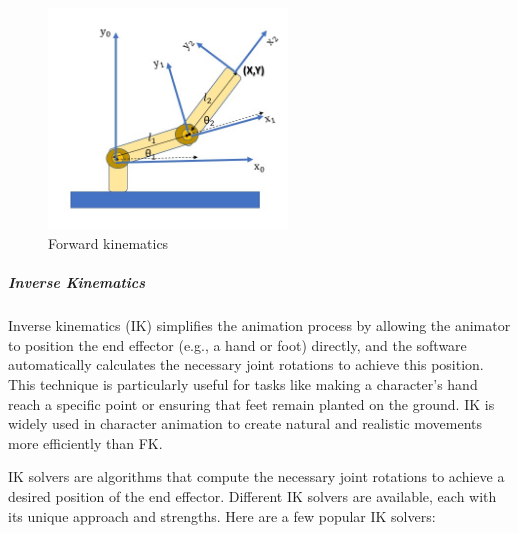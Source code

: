 \documentclass[../../main.tex]{subfiles}
\begin{document}
\begin{figure} 
  \centering \includegraphics[width = 2.5in]{chapters/background_work/images/forward_kinematics_example.png} 
  \caption{Forward kinematics} 
  \label{fig:forward_kinematics_example} 
\end{figure}

\subparagraph{Inverse Kinematics}
\label{subpar:inverse_kinematics}

Inverse kinematics (IK) simplifies the animation process by allowing the animator to position the end effector (e.g., a hand or foot) directly, and the software automatically calculates the necessary joint rotations to achieve this position. This technique is particularly useful for tasks like making a character’s hand reach a specific point or ensuring that feet remain planted on the ground. IK is widely used in character animation to create natural and realistic movements more efficiently than FK.

IK solvers are algorithms that compute the necessary joint rotations to achieve a desired position of the end effector. Different IK solvers are available, each with its unique approach and strengths. Here are a few popular IK solvers:
\end{document}
